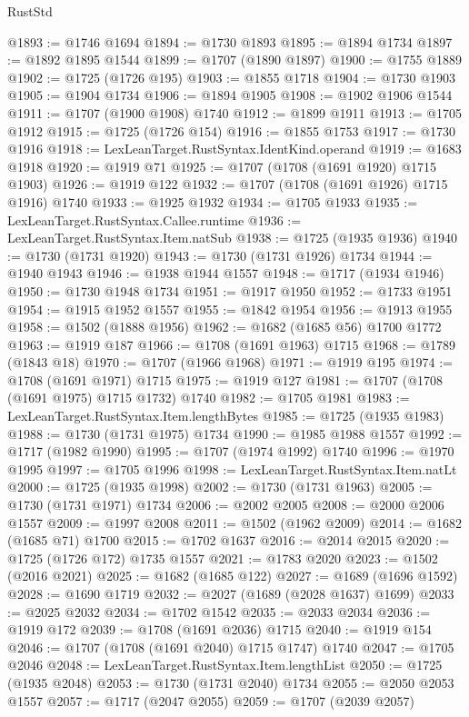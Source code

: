 \begin{lexlean}{RustStd}
\begin{coremodule}
@1893 := @1746 @1694
@1894 := @1730 @1893
@1895 := @1894 @1734
@1897 := @1892 @1895 @1544
@1899 := @1707 (@1890 @1897)
@1900 := @1755 @1889
@1902 := @1725 (@1726 @195)
@1903 := @1855 @1718
@1904 := @1730 @1903
@1905 := @1904 @1734
@1906 := @1894 @1905
@1908 := @1902 @1906 @1544
@1911 := @1707 (@1900 @1908) @1740
@1912 := @1899 @1911
@1913 := @1705 @1912
@1915 := @1725 (@1726 @154)
@1916 := @1855 @1753
@1917 := @1730 @1916
@1918 := LexLeanTarget.RustSyntax.IdentKind.operand
@1919 := @1683 @1918
@1920 := @1919 @71
@1925 := @1707 (@1708 (@1691 @1920) @1715 @1903)
@1926 := @1919 @122
@1932 := @1707 (@1708 (@1691 @1926) @1715 @1916) @1740
@1933 := @1925 @1932
@1934 := @1705 @1933
@1935 := LexLeanTarget.RustSyntax.Callee.runtime
@1936 := LexLeanTarget.RustSyntax.Item.natSub
@1938 := @1725 (@1935 @1936)
@1940 := @1730 (@1731 @1920)
@1943 := @1730 (@1731 @1926) @1734
@1944 := @1940 @1943
@1946 := @1938 @1944 @1557
@1948 := @1717 (@1934 @1946)
@1950 := @1730 @1948 @1734
@1951 := @1917 @1950
@1952 := @1733 @1951
@1954 := @1915 @1952 @1557
@1955 := @1842 @1954
@1956 := @1913 @1955
@1958 := @1502 (@1888 @1956)
@1962 := @1682 (@1685 @56) @1700 @1772
@1963 := @1919 @187
@1966 := @1708 (@1691 @1963) @1715
@1968 := @1789 (@1843 @18)
@1970 := @1707 (@1966 @1968)
@1971 := @1919 @195
@1974 := @1708 (@1691 @1971) @1715
@1975 := @1919 @127
@1981 := @1707 (@1708 (@1691 @1975) @1715 @1732) @1740
@1982 := @1705 @1981
@1983 := LexLeanTarget.RustSyntax.Item.lengthBytes
@1985 := @1725 (@1935 @1983)
@1988 := @1730 (@1731 @1975) @1734
@1990 := @1985 @1988 @1557
@1992 := @1717 (@1982 @1990)
@1995 := @1707 (@1974 @1992) @1740
@1996 := @1970 @1995
@1997 := @1705 @1996
@1998 := LexLeanTarget.RustSyntax.Item.natLt
@2000 := @1725 (@1935 @1998)
@2002 := @1730 (@1731 @1963)
@2005 := @1730 (@1731 @1971) @1734
@2006 := @2002 @2005
@2008 := @2000 @2006 @1557
@2009 := @1997 @2008
@2011 := @1502 (@1962 @2009)
@2014 := @1682 (@1685 @71) @1700
@2015 := @1702 @1637
@2016 := @2014 @2015
@2020 := @1725 (@1726 @172) @1735 @1557
@2021 := @1783 @2020
@2023 := @1502 (@2016 @2021)
@2025 := @1682 (@1685 @122)
@2027 := @1689 (@1696 @1592)
@2028 := @1690 @1719
@2032 := @2027 (@1689 (@2028 @1637) @1699)
@2033 := @2025 @2032
@2034 := @1702 @1542
@2035 := @2033 @2034
@2036 := @1919 @172
@2039 := @1708 (@1691 @2036) @1715
@2040 := @1919 @154
@2046 := @1707 (@1708 (@1691 @2040) @1715 @1747) @1740
@2047 := @1705 @2046
@2048 := LexLeanTarget.RustSyntax.Item.lengthList
@2050 := @1725 (@1935 @2048)
@2053 := @1730 (@1731 @2040) @1734
@2055 := @2050 @2053 @1557
@2057 := @1717 (@2047 @2055)
@2059 := @1707 (@2039 @2057)

\end{coremodule}
\end{lexlean}
